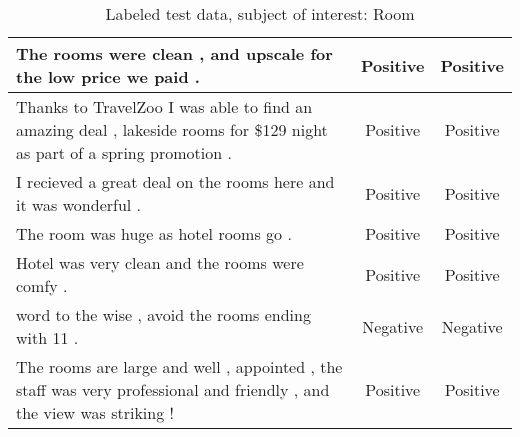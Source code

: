 \begin{table}[f]
\begin{center}
\begin{tabular}{m{8cm}cc}
The rooms were clean , and upscale for the low price we paid .
& Positive & Positive \\ \hline
Thanks to TravelZoo I was able to find an amazing deal , lakeside rooms for \$129 night as part of a spring promotion .
& Positive & Positive \\ \hline
I recieved a great deal on the rooms here and it was wonderful .
& Positive & Positive \\ \hline
The room was huge as hotel rooms go .
& Positive & Positive \\ \hline
Hotel was very clean and the rooms were comfy .
& Positive & Positive \\ \hline
word to the wise , avoid the rooms ending with 11 .
& Negative & Negative \\ \hline
The rooms are large and well , appointed , the staff was very professional and friendly , and the view was striking ! 
& Positive & Positive 
\end{tabular}
\end{center}
\caption{Labeled test data, subject of interest: Room}
\label{table:labeling}
\end{table}
